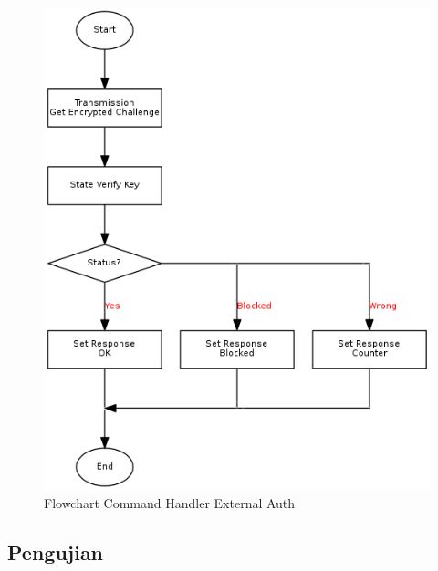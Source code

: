 \begin{figure}[h]
\centering
\includegraphics[height=0.5\textheight]{image/command/flow_cmdextauth.png}
\caption{Flowchart Command Handler External Auth}
\label{fig-flow-cmdextauth}
\end{figure}

\subsection {Pengujian}


